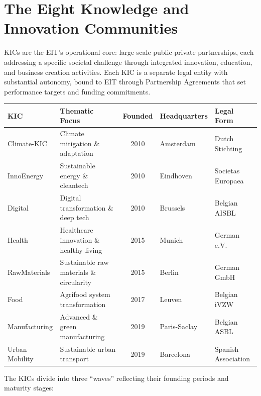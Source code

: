 \documentclass[../main.tex]{subfiles}
\begin{document}
\section*{The Eight Knowledge and Innovation Communities}

KICs are the EIT's operational core: large-scale public-private partnerships, each addressing a specific societal challenge through integrated innovation, education, and business creation activities. Each KIC is a separate legal entity with substantial autonomy, bound to EIT through Partnership Agreements that set performance targets and funding commitments.

\tableminimal
\begin{center}
\begin{tabular}{@{}p{2.2cm}p{2.8cm}cp{2cm}p{2.5cm}@{}}
\toprule
\textbf{KIC} & \textbf{Thematic Focus} & \textbf{Founded} & \textbf{Headquarters} & \textbf{Legal Form} \\
\midrule
Climate-KIC & Climate mitigation \& adaptation & 2010 & Amsterdam & Dutch Stichting \\
InnoEnergy & Sustainable energy \& cleantech & 2010 & Eindhoven & Societas Europaea \\
Digital & Digital transformation \& deep tech & 2010 & Brussels & Belgian AISBL \\
Health & Healthcare innovation \& healthy living & 2015 & Munich & German e.V. \\
RawMaterials & Sustainable raw materials \& circularity & 2015 & Berlin & German GmbH \\
Food & Agrifood system transformation & 2017 & Leuven & Belgian iVZW \\
Manufacturing & Advanced \& green manufacturing & 2019 & Paris-Saclay & Belgian ASBL \\
Urban Mobility & Sustainable urban transport & 2019 & Barcelona & Spanish Association \\
\bottomrule
\end{tabular}
\end{center}

The KICs divide into three ``waves'' reflecting their founding periods and maturity stages:
\end{document}
